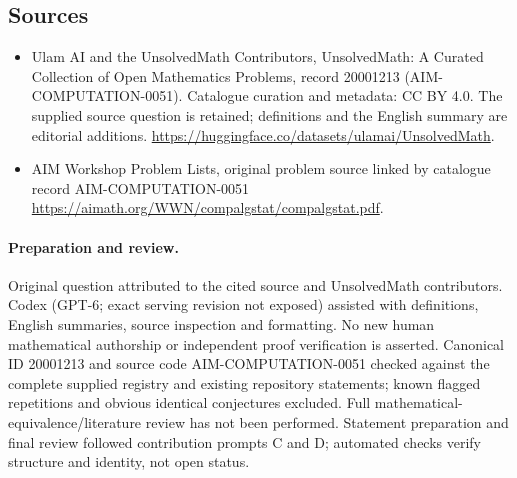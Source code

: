 \documentclass[11pt]{article}
\begin{document}
\subsection{Sources}
\begin{itemize}
\item[\hypertarget{source:20001213:1}{S1}] Ulam AI and the UnsolvedMath Contributors, UnsolvedMath: A Curated Collection of Open Mathematics Problems, record 20001213 (AIM-COMPUTATION-0051). Catalogue curation and metadata: CC BY 4.0. The supplied source question is retained; definitions and the English summary are editorial additions.
\url{https://huggingface.co/datasets/ulamai/UnsolvedMath}.
\item[\hypertarget{source:20001213:2}{S2}] AIM Workshop Problem Lists, original problem source linked by catalogue record AIM-COMPUTATION-0051
\url{https://aimath.org/WWN/compalgstat/compalgstat.pdf}.
\end{itemize}
\paragraph{Preparation and review.}
Original question attributed to the cited source and UnsolvedMath contributors. Codex (GPT-6; exact serving revision not exposed) assisted with definitions, English summaries, source inspection and formatting. No new human mathematical authorship or independent proof verification is asserted. Canonical ID 20001213 and source code AIM-COMPUTATION-0051 checked against the complete supplied registry and existing repository statements; known flagged repetitions and obvious identical conjectures excluded. Full mathematical-equivalence/literature review has not been performed. Statement preparation and final review followed contribution prompts C and D; automated checks verify structure and identity, not open status.
\label{end:20001213}
\end{document}
